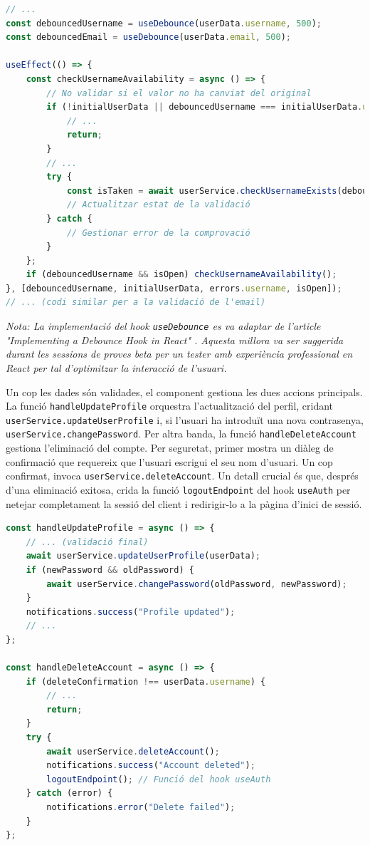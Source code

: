 \begin{lstlisting}[language=javascript, caption={Ús de `useDebounce` per a la validació a `UserSettings/index.tsx`}]
// ...
const debouncedUsername = useDebounce(userData.username, 500);
const debouncedEmail = useDebounce(userData.email, 500);

useEffect(() => {
    const checkUsernameAvailability = async () => {
        // No validar si el valor no ha canviat del original
        if (!initialUserData || debouncedUsername === initialUserData.username) {
            // ...
            return;
        }
        // ...
        try {
            const isTaken = await userService.checkUsernameExists(debouncedUsername);
            // Actualitzar estat de la validació
        } catch {
            // Gestionar error de la comprovació
        }
    };
    if (debouncedUsername && isOpen) checkUsernameAvailability();
}, [debouncedUsername, initialUserData, errors.username, isOpen]);
// ... (codi similar per a la validació de l'email)
\end{lstlisting}

\textit{Nota: La implementació del hook \texttt{useDebounce} es va adaptar de l'article "Implementing a Debounce Hook in React" \cite{debounce_hook_react}. Aquesta millora va ser suggerida durant les sessions de proves beta per un tester amb experiència professional en React per tal d'optimitzar la interacció de l'usuari.}

Un cop les dades són validades, el component gestiona les dues accions principals. La funció \texttt{handleUpdateProfile} orquestra l'actualització del perfil, cridant \texttt{userService.updateUserProfile} i, si l'usuari ha introduït una nova contrasenya, \texttt{userService.changePassword}. Per altra banda, la funció \texttt{handleDeleteAccount} gestiona l'eliminació del compte. Per seguretat, primer mostra un diàleg de confirmació que requereix que l'usuari escrigui el seu nom d'usuari. Un cop confirmat, invoca \texttt{userService.deleteAccount}. Un detall crucial és que, després d'una eliminació exitosa, crida la funció \texttt{logoutEndpoint} del hook \texttt{useAuth} per netejar completament la sessió del client i redirigir-lo a la pàgina d'inici de sessió.

\begin{lstlisting}[language=javascript, caption={Orquestració de les crides a l'API a `UserSettings/index.tsx`}]
const handleUpdateProfile = async () => {
    // ... (validació final)
    await userService.updateUserProfile(userData);
    if (newPassword && oldPassword) {
        await userService.changePassword(oldPassword, newPassword);
    }
    notifications.success("Profile updated");
    // ...
};

const handleDeleteAccount = async () => {
    if (deleteConfirmation !== userData.username) {
        // ...
        return;
    }
    try {
        await userService.deleteAccount();
        notifications.success("Account deleted");
        logoutEndpoint(); // Funció del hook useAuth
    } catch (error) {
        notifications.error("Delete failed");
    }
};
\end{lstlisting}

